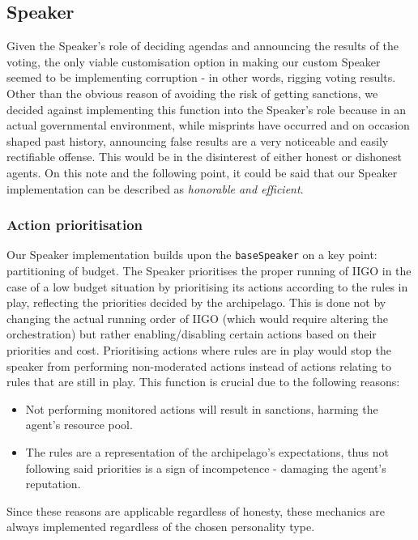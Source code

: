 \subsection{Speaker}
Given the Speaker's role of deciding agendas and announcing the results of the voting, the only viable customisation option in making our custom Speaker seemed to be implementing corruption - in other words, rigging voting results. Other than the obvious reason of avoiding the risk of getting sanctions, we decided against implementing this function into the Speaker's role because in an actual governmental environment, while misprints have occurred and on occasion shaped past history, announcing false results are a very noticeable and easily rectifiable offense. This would be in the disinterest of either honest or dishonest agents. On this note and the following point, it could be said that our Speaker implementation can be described as \emph{honorable and efficient}.

\subsubsection{Action prioritisation}

Our Speaker implementation builds upon the \texttt{baseSpeaker} on a key point: partitioning of budget. The Speaker prioritises the proper running of IIGO in the case of a low budget situation by prioritising its actions according to the rules in play, reflecting the priorities decided by the archipelago. This is done not by changing the actual running order of IIGO (which would require altering the orchestration) but rather enabling/disabling certain actions based on their priorities and cost. Prioritising actions where rules are in play would stop the speaker from performing non-moderated actions instead of actions relating to rules that are still in play. This function is crucial due to the following reasons:
\begin{itemize}
    \item Not performing monitored actions will result in sanctions, harming the agent's resource pool.
    \item The rules are a representation of the archipelago's expectations, thus not following said priorities is a sign of incompetence - damaging the agent's reputation.
\end{itemize}
Since these reasons are applicable regardless of honesty, these mechanics are always implemented regardless of the chosen personality type.

